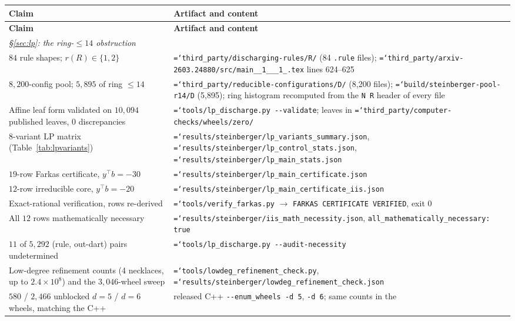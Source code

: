 \documentclass[11pt]{article}
\theoremstyle{definition}
\newcommand{\art}[1]{{\texttt{\hyphenchar\font=`\-\relax #1}}}
\begin{document}
{\small
\begin{longtable}{p{}p{}}
\toprule
\textbf{Claim} & \textbf{Artifact and content} \\
\midrule
\endfirsthead
\toprule
\textbf{Claim} & \textbf{Artifact and content} \\
\midrule
\endhead
\multicolumn{2}{l}{\emph{\S\ref{sec:lp}: the ring-$\le14$ obstruction}}\\[2pt]
$84$ rule shapes; $r(R)\in\{1,2\}$ &
  \art{third\_party/discharging-rules/R/} (84 \texttt{.rule} files);
  \art{third\_party/arxiv-2603.24880/src/main\_\_1\_\_\_1\_.tex} lines 624--625 \\
$8{,}200$-config pool; $5{,}895$ of ring $\le14$ &
  \art{third\_party/reducible-configurations/D/} (8{,}200 files);
  \art{build/steinberger-pool-r14/D} (5{,}895); ring histogram recomputed from
  the \texttt{N R} header of every file \\
Affine leaf form validated on $10{,}094$ published leaves, $0$ discrepancies &
  \art{tools/lp\_discharge.py -{}-validate}; leaves in
  \art{third\_party/computer-checks/wheels/zero/} \\
$8$-variant LP matrix (Table~\ref{tab:lpvariants}) &
  \art{results/steinberger/lp\_variants\_summary.json},
  \art{results/steinberger/lp\_control\_stats.json},
  \art{results/steinberger/lp\_main\_stats.json} \\
$19$-row Farkas certificate, $y^\top b=-30$ &
  \art{results/steinberger/lp\_main\_certificate.json} \\
$12$-row irreducible core, $y^\top b=-20$ &
  \art{results/steinberger/lp\_main\_certificate\_iis.json} \\
Exact-rational verification, rows re-derived &
  \art{tools/verify\_farkas.py} $\to$ \texttt{FARKAS CERTIFICATE VERIFIED}, exit 0 \\
All $12$ rows mathematically necessary &
  \art{results/steinberger/iis\_math\_necessity.json},
  \texttt{all\_mathematically\_necessary: true} \\
$11$ of $5{,}292$ (rule, out-dart) pairs undetermined &
  \art{tools/lp\_discharge.py -{}-audit-necessity} \\
Low-degree refinement counts (4 necklaces, up to $2.4\times10^8$) and the
  $3{,}046$-wheel sweep &
  \art{tools/lowdeg\_refinement\_check.py},
  \art{results/steinberger/lowdeg\_refinement\_check.json} \\
$580$ / $2{,}466$ unblocked $d{=}5$ / $d{=}6$ wheels, matching the C++ &
  released C++ \texttt{-{}-enum\_wheels -d 5}, \texttt{-d 6}; same counts in the

\end{longtable}}
\end{document}

